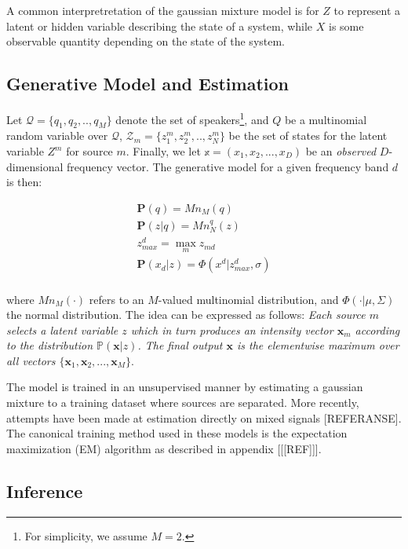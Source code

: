 \documentclass[11pt, oneside, a4paper]{report}
\begin{document}
A common interpretretation of the gaussian mixture model is for $Z$ to
represent a latent or hidden variable describing the state of a
system, while $X$ is some observable quantity depending on the state
of the system. 


\subsection{Generative Model and Estimation}

Let $\mathcal{Q} = \{q_1, q_2, .. , q_M\}$ denote the set of speakers\footnote{For simplicity, we assume $M=2$.}, and $Q$ be a multinomial random variable over $\mathcal{Q}$, $\mathcal{Z}_m  = \{z_1^m, z_2^m, .. , z_N^m\}$ be the set of states for the latent variable $Z^m$ for source $m$. Finally, we let $\mathbb{x} = (x_1,x_2,...,x_D)$ be an \emph{observed} $D$-dimensional frequency vector. The generative model for a given frequency band $d$ is then:

\begin{equation}
  \label{maxvq_eqn}
  \begin{array}{lcl}
    \mathbf{P}(q)   = Mn_M(q) \\
    \mathbf{P}(z|q) = Mn_N^q(z) \\ 
    z^d_{max} = \max_mz_{md} \\
    \mathbf{P}(x_d|z) = \Phi(x^d|z^d_{max},\sigma) \\
  \end{array}
\end{equation}

where $Mn_M(\cdot)$ refers to an $M$-valued multinomial distribution,
and $\Phi(\cdot|\mu,\Sigma)$ the normal distribution. The idea can be
expressed as follows: \emph{Each source $m$ selects a latent variable
  $z$ which in turn produces an intensity vector $\mathbf{x}_m$
  according to the distribution $\mathbb{P}(\mathbf{x}|z)$. The final
  output $\mathbf{x}$ is the elementwise maximum over all vectors
  $\{\mathbf{x}_1, \mathbf{x}_2, ..., \mathbf{x}_M\}$}.


The model is trained in an unsupervised manner by estimating a
gaussian mixture to a training dataset where sources are
separated. More recently, attempts have been made at estimation
directly on mixed signals [REFERANSE]. The canonical training method
used in these models is the expectation maximization (EM) algorithm as
described in appendix [[[REF]]]. 


\subsection{Inference}
\end{document}
